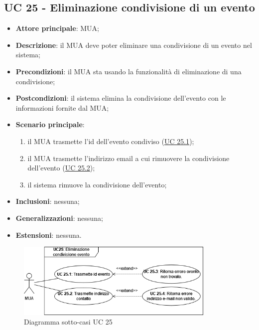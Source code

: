 \subsection{UC 25 - Eliminazione condivisione di un evento} \label{sec:UC25}

    \begin{itemize}
        \item \textbf{Attore principale}: MUA;
        \item \textbf{Descrizione}: il MUA deve poter eliminare una condivisione di un evento nel sistema;
        \item \textbf{Precondizioni}: il MUA sta usando la funzionalità di eliminazione di una condivisione;
        \item \textbf{Postcondizioni}: il sistema elimina la condivisione dell'evento con le informazioni fornite dal MUA;
        \item \textbf{Scenario principale}:
            \begin{enumerate}
                \item il MUA trasmette l'id dell'evento condiviso (\hyperref[sec:UC25.1]{UC 25.1});
                \item il MUA trasmette l'indirizzo email a cui rimuovere la condivisione dell'evento (\hyperref[sec:UC25.2]{UC 25.2});
                \item il sistema rimuove la condivisione dell'evento;
            \end{enumerate}
        \item \textbf{Inclusioni}: nessuna;
        \item \textbf{Generalizzazioni}: nessuna;
        \item \textbf{Estensioni}: nessuna.
    \end{itemize}

    \begin{figure}[H]
        \includegraphics[width=0.85\textwidth]{sections/uc_imgs/UC25.png}
        \centering
        \caption{Diagramma sotto-casi UC 25}
    \end{figure}

